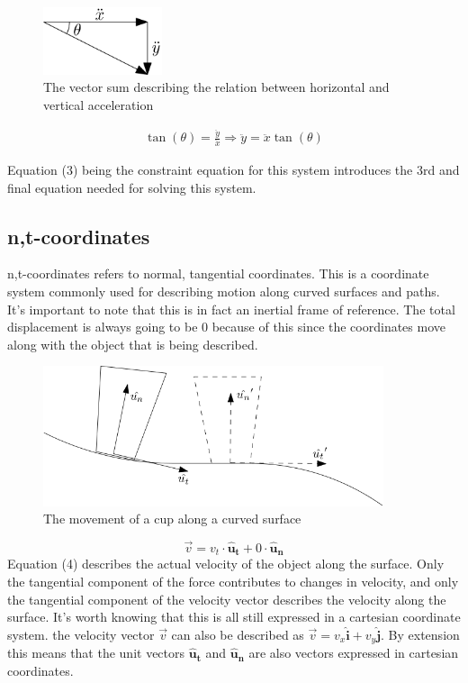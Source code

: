 \documentclass[11pt, a4paper]{article}
\begin{document}
\begin{figure}[h]
    \centerline{\includegraphics[width=3.5cm]{images/Vector_Sum.png}}
    \caption{The vector sum describing the relation between horizontal and vertical acceleration}
\end{figure}

\begin{gather}
    \tan(\theta) = \frac{\ddot{y}}{\ddot{x}} \Rightarrow \ddot{y} = \ddot{x} \tan(\theta)  
\end{gather}

Equation (3) being the constraint equation for this system introduces the 3rd and final equation needed for
solving this system.

\subsection{n,t-coordinates}
n,t-coordinates refers to normal, tangential coordinates. This is a coordinate system commonly used for describing
motion along curved surfaces and paths. It's important to note that this is in fact an inertial frame of reference. The
total displacement is always going to be 0 because of this since the coordinates move along with the object that
is being described.
\begin{figure}[h]
    \centerline{\includegraphics[width=10cm]{images/NT_example.png}}
    \caption{The movement of a cup along a curved surface}
\end{figure}

\begin{equation}
    \vec{v} = v_t \cdot \boldsymbol{\hat{u}_t} + 0 \cdot \boldsymbol{\hat{u}_n}
\end{equation}
Equation (4) describes the actual velocity of the object along the surface. Only the tangential component of the
force contributes to changes in velocity, and only the tangential component of the velocity vector describes
the velocity along the surface. It's worth knowing that this is all still expressed in a cartesian coordinate system.
the velocity vector $\vec{v}$ can also be described as $\vec{v} = v_x\boldsymbol{\hat{i}} + v_y\boldsymbol{\hat{j}}$.
By extension this means that the unit vectors $\boldsymbol{\hat{u}_t}$ and $\boldsymbol{\hat{u}_n}$ are also vectors expressed in cartesian coordinates.
\end{document}
